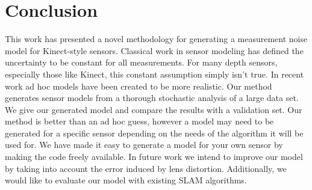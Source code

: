 \section{Conclusion} \label{sec:conclusion} 



This work has presented a novel methodology for generating a measurement noise
model for Kinect-style sensors.  Classical work in sensor modeling has defined
the uncertainty to be constant for all measurements. For many depth sensors,
especially those like Kinect, this constant assumption simply isn't true. In
recent work ad hoc models have been created to be more realistic. Our method
generates sensor models from a thorough stochastic analysis of a large data
set. We give our generated model and compare the results with a validation set.
Our method is better than an ad hoc guess, however a model may need to be
generated for a specific sensor depending on the needs of the algorithm it will
be used for. We have made it easy to generate a model for your own sensor by
making the code freely available. In future work we intend to improve our model
by taking into account the error induced by lens distortion. Additionally, we
would like to evaluate our model with existing SLAM algorithms.
